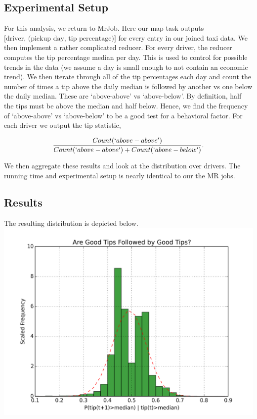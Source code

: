 \documentclass[twoside]{article}
\begin{document}
\begin{multicols}{2}
\subsection{Experimental Setup}
For this analysis, we return to MrJob. Here our map task outputs $\text{[driver, (pickup day, tip percentage)]}$
for every entry in our joined taxi data. We then implement a rather complicated reducer.  For every driver, the reducer computes the tip percentage median per day. This is used to control for possible trends in the data (we assume a day is small enough to not contain an economic trend). We then iterate through all of the tip percentages each day and count the number of times a tip above the daily median is followed by another vs one below the daily median. These are `above-above' vs `above-below'. By definition, half the tips must be above the median and half below. Hence, we find the frequency of `above-above' vs `above-below' to be a good test for a behavioral factor. For each driver we output the tip statistic,

$$\frac{Count(`above-above')}{Count(`above-above') + Count(`above-below')}.$$

We then aggregate these results and look at the distribution over drivers. The running time and experimental setup is nearly identical to our the MR jobs. 
\subsection{Results}
The resulting distribution is depicted below. 
\includegraphics[scale=.35]{hothand.png}


\end{multicols}
\end{document}
